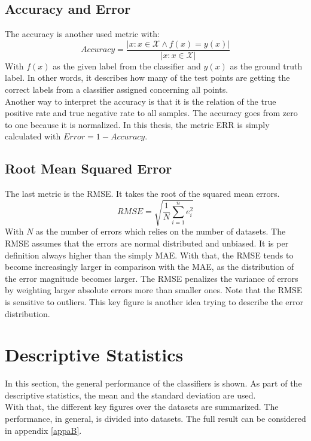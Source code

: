 \subsection{Accuracy and Error}
The accuracy is another used metric with:\cite{Long.2015}
\begin{equation}
	Accuracy = \frac{| x : x \in \mathcal{X} \wedge f(x) = y(x)|}{|x : x \in \mathcal{X}|}
\end{equation}
With $f(x)$ as the given label from the classifier and $y(x)$ as the ground truth label.
In other words, it describes how many of the test points are getting the correct labels from a classifier assigned concerning all points.\\
Another way to interpret the accuracy is that it is the relation of the true positive rate and true negative rate to all samples.
The accuracy goes from zero to one because it is normalized.\cite[p. 3]{Fawcett.}
In this thesis, the metric \ac{ERR} is simply calculated with  $Error = 1 - Accuracy$.\\
\subsection{Root Mean Squared Error}
The last metric is the \ac{RMSE}. It takes the root of the squared mean errors.
\begin{equation}
	RMSE = \sqrt{\frac{1}{N} \sum_{i=1}^{n}e_i^2}
\end{equation}
With $N$ as the number of errors which relies on the number of datasets. The \ac{RMSE} assumes that the errors are normal distributed and unbiased.
It is per definition always higher than the simply \ac{MAE}.
With that, the \acs{RMSE} tends to become increasingly larger in comparison with the \acs{MAE}, as the distribution of the error magnitude becomes larger. 
The \acs{RMSE} penalizes the variance of errors by weighting larger absolute errors more than smaller ones.
Note that the \acs{RMSE} is sensitive to outliers.
This key figure is another idea trying to describe the error distribution. \cite{Chai.2014}
\FloatBarrier
\section{Descriptive Statistics}\label{EmSecTest}
In this section, the general performance of the classifiers is shown.
As part of the descriptive statistics, the mean and the standard deviation are used.\cite{Igual.2017}\\
With that, the different key figures over the datasets are summarized.
The performance, in general, is divided into datasets. The full result can be considered in appendix \ref{appaB}.

